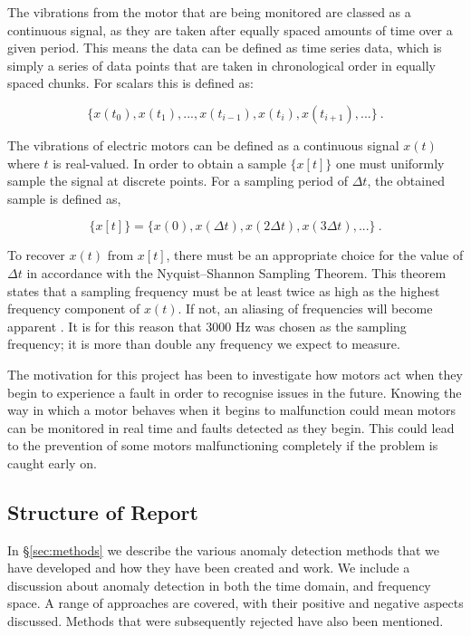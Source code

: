 The vibrations from the motor that are being monitored are classed as a continuous signal, as they are taken after equally spaced amounts of time over a given period. This means the data can be defined as time series data, which is simply a series of data points that are taken in chronological order in equally spaced chunks. For scalars this is defined as:

\begin{equation}
    \{x(t_0), x(t_1), ..., x(t_{i-1}), x(t_i), x(t_{i+1}), ...\}~.
\end{equation}

The vibrations of electric motors can be defined as a continuous signal $x(t)$ where $t$ is real-valued. In order to obtain a sample $\{x[t]\}$ one must uniformly sample the signal at discrete points. For a sampling period of $\Delta t$, the obtained sample is defined as,

\begin{equation}
    \{x[t]\} = \{x(0), x(\Delta t), x(2\Delta t), x(3\Delta t),...\}~.
\end{equation}

To recover $x(t)$ from $x[t]$, there must be an appropriate choice for the value of $\Delta t$ in accordance with the Nyquist–Shannon Sampling Theorem. This theorem states that a sampling frequency must be at least twice as high as the highest frequency component of $x(t)$. If not, an aliasing of frequencies will become apparent \cite{Ficker2015}. It is for this reason that 3000 Hz was chosen as the sampling frequency; it is more than double any frequency we expect to measure.

The motivation for this project has been to investigate how motors act when they begin to experience a fault in order to recognise issues in the future. Knowing the way in which a motor behaves when it begins to malfunction could mean motors can be monitored in real time and faults detected as they begin. This could lead to the prevention of some motors malfunctioning completely if the problem is caught early on.


\subsection{Structure of Report}

In \S\ref{sec:methods} we describe the various anomaly detection methods that we have developed and how they have been created and work. We include a discussion about anomaly detection in both the time domain, and frequency space. A range of approaches are covered, with their positive and negative aspects discussed. Methods that were subsequently rejected have also been mentioned.

